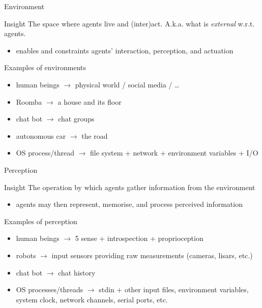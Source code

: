 \documentclass[presentation]{beamer}\mode<presentation>{\usetheme{AMSBolognaFC}}
\begin{document}
\begin{frame}[c]{Environment}
%
\begin{block}{Insight}
	The space where agents live and (inter)act. A.k.a. what is \emph{external} w.r.t. agents.
	\begin{itemize}
		\item enables and constraints agents' \alert{interaction}, \alert{perception}, and \alert{actuation}
	\end{itemize}
\end{block}
%
\begin{exampleblock}{Examples of environments}
	\begin{itemize}
		\item human beings $\rightarrow$ physical world / social media / \ldots
		\item Roomba $\rightarrow$ a house and its floor
		\item chat bot $\rightarrow$ chat groups
		\item autonomous car $\rightarrow$ the road
		\item OS process/thread $\rightarrow$ file system + network + environment variables + I/O
	\end{itemize}
\end{exampleblock}
%
\end{frame}

\begin{frame}[c]{Perception}
%
\begin{block}{Insight}
	The operation by which agents gather information from the environment
	\begin{itemize}
		\item agents may then \alert{represent}, \alert{memorise}, and \alert{process} perceived information
	\end{itemize}
\end{block}
%
\begin{exampleblock}{Examples of perception}
	\begin{itemize}
		\item human beings $\rightarrow$ 5 sense + introspection + proprioception
		\item robots $\rightarrow$ input sensors providing raw measurements (cameras, lisars, etc.)
		\item chat bot $\rightarrow$ chat history
		\item OS processes/threads $\rightarrow$ stdin + other input files, environment variables, system clock, network channels, serial ports, etc.
	\end{itemize}
\end{exampleblock}
%
\end{frame}
\end{document}
